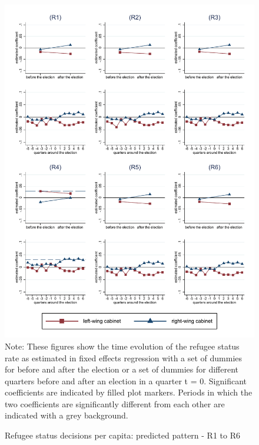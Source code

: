 \documentclass[11pt,a4paper]{scrartcl}
\begin{document}
\clearpage
\FloatBarrier
\begin{figure}[!ht]
	\caption{Refugee status decisions per capita: predicted pattern - R1 to R6}
	\includegraphics[width=1\textwidth]{../results/decisions/refugeestatus_rate_graphs_R1-R6.pdf}
	\scriptsize{Note: These figures show the time evolution of the refugee status rate as estimated in fixed effects regression with a set of dummies for before and after the election or a set of dummies for different quarters before and after an election in a quarter t = 0. Significant coefficients are indicated by filled plot markers. Periods in which the two coefficients are significantly different from each other are indicated with a grey background.}
\end{figure}

\clearpage
\FloatBarrier


\end{document}
